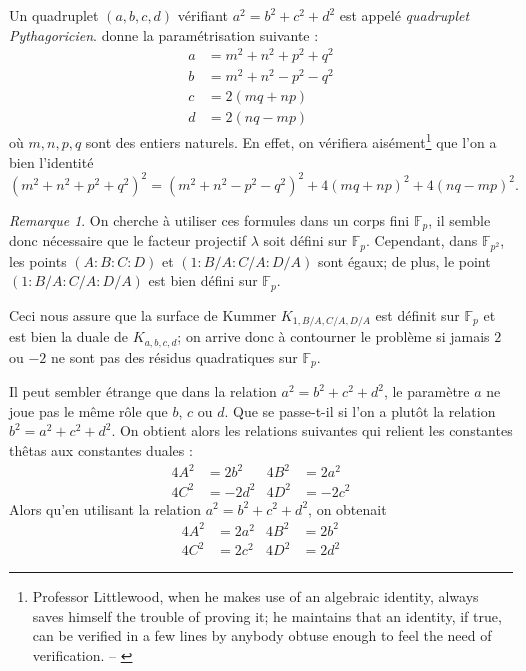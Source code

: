 \documentclass[a4paper,12pt]{article}
\theoremstyle{definition}
\theoremstyle{remark}
\newtheorem{remarque}{Remarque}
\numberwithin{equation}{section}
\begin{document}
Un quadruplet $(a,b,c,d)$ vérifiant $a^2 = b^2 + c^2 + d^2$ est appelé \emph{quadruplet Pythagoricien}. \citet{mordell} donne la paramétrisation suivante :
\begin{align*}
a &= m^2 + n^2 + p^2 + q^2 \\
b &= m^2 + n^2 - p^2 - q^2 \\
c &= 2(mq+np) \\
d &= 2(nq-mp)
\end{align*}
où $m,n,p,q$ sont des entiers naturels. En effet, on vérifiera aisément\footnote{Professor Littlewood, when he makes use of an algebraic identity, always saves himself the trouble of proving it;
he maintains that an identity, if true, can be verified in a few
lines by anybody obtuse enough to feel the need of verification. -- \citet{dyson}} que l'on a bien l'identité
$$(m^2 + n^2 + p^2 + q^2)^2 = (m^2 + n^2 - p^2 - q^2)^2 + 4(mq+np)^2 + 4(nq-mp)^2 .$$

\begin{remarque}
On cherche à utiliser ces formules dans un corps fini $\mathbb{F}_p$, il semble donc nécessaire que le facteur projectif $\lambda$ soit défini sur $\mathbb{F}_p$. Cependant, dans $\mathbb{F}_{p^2}$, les points $(A:B:C:D)$ et $(1:B/A:C/A:D/A)$ sont égaux; de plus, le point $(1:B/A:C/A:D/A)$ est bien défini sur $\mathbb{F}_p$.

Ceci nous assure que la surface de Kummer $K_{1,B/A,C/A,D/A}$ est définit sur $\mathbb{F}_p$ et est bien la duale de $K_{a,b,c,d}$; on arrive donc à contourner le problème si jamais $2$ ou $-2$ ne sont pas des résidus quadratiques sur $\mathbb{F}_p$.
\end{remarque}


Il peut sembler étrange que dans la relation $a^2 = b^2 + c^2 + d^2$, le paramètre $a$ ne joue pas le même rôle que $b$, $c$ ou $d$. Que se passe-t-il si l'on a plutôt la relation $b^2 = a^2 + c^2 + d^2$. On obtient alors les relations suivantes qui relient les constantes thêtas aux constantes duales :
\begin{align*}
4A^2 &= 2b^2  &4B^2 &= 2a^2 \\
4C^2 &= -2d^2  &4D^2 &= -2c^2
\end{align*}
Alors qu'en utilisant la relation $a^2 = b^2 + c^2 + d^2$, on obtenait
\begin{align*}
4A^2 &= 2a^2  &4B^2 &= 2b^2 \\
4C^2 &= 2c^2  &4D^2 &= 2d^2
\end{align*}
\end{document}
